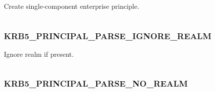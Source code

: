 \documentclass[letterpaper,10pt,english]{sphinxmanual}
\begin{document}
Create single-component enterprise principle.

\begin{tabulary}{\linewidth}{|L|L|}
\hline

 & 
\\\hline
\end{tabulary}



\subsubsection{KRB5\_PRINCIPAL\_PARSE\_IGNORE\_REALM}
\label{appdev/refs/macros/KRB5_PRINCIPAL_PARSE_IGNORE_REALM::doc}\label{appdev/refs/macros/KRB5_PRINCIPAL_PARSE_IGNORE_REALM:krb5-principal-parse-ignore-realm}\label{appdev/refs/macros/KRB5_PRINCIPAL_PARSE_IGNORE_REALM:krb5-principal-parse-ignore-realm-data}

\begin{fulllineitems}
\label{appdev/refs/macros/KRB5_PRINCIPAL_PARSE_IGNORE_REALM:KRB5_PRINCIPAL_PARSE_IGNORE_REALM}
\end{fulllineitems}


Ignore realm if present.

\begin{tabulary}{\linewidth}{|L|L|}
\hline

 & 
\\\hline
\end{tabulary}



\subsubsection{KRB5\_PRINCIPAL\_PARSE\_NO\_REALM}
\label{appdev/refs/macros/KRB5_PRINCIPAL_PARSE_NO_REALM:krb5-principal-parse-no-realm-data}\label{appdev/refs/macros/KRB5_PRINCIPAL_PARSE_NO_REALM::doc}\label{appdev/refs/macros/KRB5_PRINCIPAL_PARSE_NO_REALM:krb5-principal-parse-no-realm}

\begin{fulllineitems}
\label{appdev/refs/macros/KRB5_PRINCIPAL_PARSE_NO_REALM:KRB5_PRINCIPAL_PARSE_NO_REALM}
\end{fulllineitems}
\end{document}
